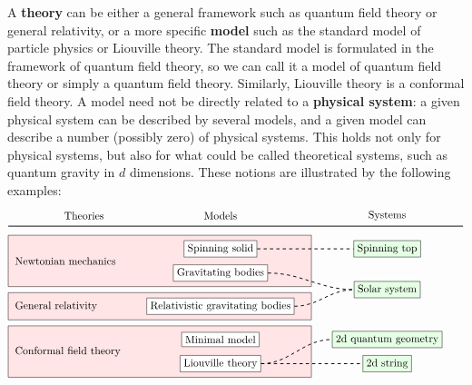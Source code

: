 \documentclass[12pt, a4paper, notitlepage, twoside]{report}
\numberwithin{equation}{section}
\theoremstyle{break}
\begin{document}
A \textbf{\boldmath theory} can be either a general framework such as quantum field theory or general relativity, or a more specific \textbf{\boldmath model} such as the standard model of particle physics or Liouville theory.
The standard model is formulated in the framework of quantum field theory, so we can call it a model of quantum field theory or simply a quantum field theory.
Similarly, Liouville theory is a conformal field theory.
A model need not be directly related to a \textbf{\boldmath physical system}: a given physical system can be described by several models, and a given model can describe a number (possibly zero) of physical systems.
This holds not only for physical systems, but also for what could be called theoretical systems, such as quantum gravity in $d$ dimensions.
These notions are illustrated by the following examples:
\begin{align}
 \begin{tikzpicture}[scale = .5]
  \node at (5,11){Theories};
  \node at (14,11){Models};
  \node at (25,11){Systems};
  \draw[thick] (0,10.3) -- (30,10.3);
  \draw[fill = red!10] (0, 6.3) rectangle (20, 9.7);
  \draw[fill = red!10] (0, 4.1) rectangle (20, 5.9);
  \draw[fill = red!10] (0, .3) rectangle (20, 3.7);
  \node at (.2, 8)[right] {Newtonian mechanics};
  \node at (.2, 5)[right] {General relativity};
  \node at (.2, 2)[right] {Conformal field theory};
  \draw (14, 8.8) node[draw, fill = white] (ss) {Spinning solid};
  \draw (14, 7.2) node[draw, fill = white] (gb) {Gravitating bodies};
  \draw (14, 5) node[draw, fill = white] (rgb) {Relativistic gravitating bodies};
  \draw (14, 2.8) node[draw, fill = white] (mm) {Minimal model};
  \draw (14, 1.2) node[draw, fill = white] (lt) {Liouville theory};
  \draw (25, 8.8) node[draw, fill = green!10] (st) {Spinning top};
  \draw (25, 6.1) node[draw, fill = green!10] (ssys) {Solar system};
  \draw (25, 2.8) node[draw, fill = green!10] (qg) {2d quantum geometry};
  \draw (25, 1.2) node[draw, fill = green!10] (str) {2d string};
  \draw[thick, dashed] (ss.east) to [out = 0, in = 180] (st.west);
  \draw[thick, dashed] (gb.east) to [out = 0, in = 180] (ssys.west);
  \draw[thick, dashed] (rgb.east) to [out = 0, in = 180] (ssys.west);
  \draw[thick, dashed] (lt.east) to [out = 0, in = 180] (qg.west);
  \draw[thick, dashed] (lt.east) to [out = 0, in = 180] (str.west);
 \end{tikzpicture}
\end{align}
\end{document}
